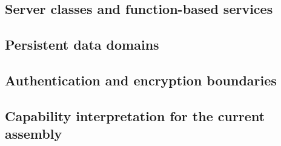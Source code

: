 \subsection{Server classes and function-based services}
\ServerClassDiagram
\clearpage
\subsection{Persistent data domains}
\DatabaseDiagram
\Needspace{10cm}
\subsection{Authentication and encryption boundaries}
\SecurityProtocolDiagram
\Needspace{12cm}
\subsection{Capability interpretation for the current assembly}
